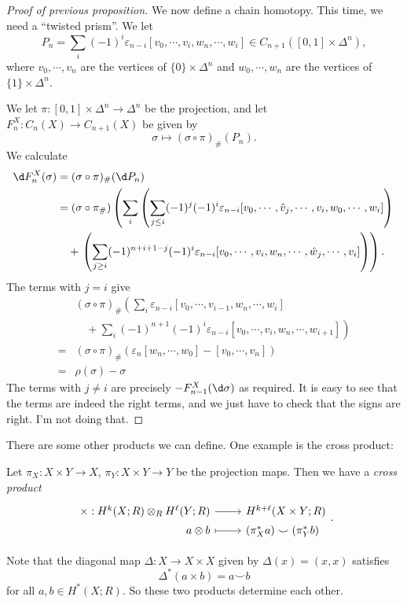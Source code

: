 \documentclass[a4paper]{article}
\begin{document}
\begin{proof}[Proof of previous proposition]
  We now define a chain homotopy. This time, we need a ``twisted prism''. We let
  \[
    P_n = \sum_i (-1)^i \varepsilon_{n - i} [v_0, \cdots, v_i, w_n, \cdots, w_i] \in C_{n + 1}([0, 1] \times \Delta^n),
  \]
  where $v_0, \cdots, v_n$ are the vertices of $\{0\} \times \Delta^n$ and $w_0, \cdots, w_n$ are the vertices of $\{1\} \times \Delta^n$.

  We let $\pi: [0, 1] \times \Delta^n \to \Delta^n$ be the projection, and let $F_n^X: C_n(X) \to C_{n + 1}(X)$ be given by
  \[
    \sigma \mapsto (\sigma \circ \pi)_\#(P_n).
  \]
  We calculate
  \begin{align*}
    \d F_n^X(\sigma) &= (\sigma \circ \pi)_\#(\d P_n) \\
    &= (\sigma \circ \pi_\#)\left(\sum_i \left(\sum_{j \leq i}(-1)^j (-1)^i \varepsilon_{n - i}[v_0, \cdots, \hat{v}_j, \cdots, v_i, w_0, \cdots, w_i]\right)\right.\\
    &\quad +\left.\left(\sum_{j \geq i} (-1)^{n + i + 1 - j}(-1)^i \varepsilon_{n - i}[v_0, \cdots, v_i, w_n, \cdots, \hat{w}_j, \cdots, v_i]\right)\right).
  \end{align*}
  The terms with $j = i$ give
  \begin{align*}
    &(\sigma \circ \pi)_\#\left(\sum_i \varepsilon_{n - i}[v_0, \cdots, v_{i - 1}, w_n, \cdots, w_i]\right. \\
    &\quad+ \left.\sum_i (-1)^{n + 1}(-1)^i \varepsilon_{n - i}[v_0, \cdots, v_i, w_n,\cdots, w_{i + 1}]\right)\\
    ={}& (\sigma \circ \pi)_\#(\varepsilon_n[w_n,\cdots, w_0] - [v_0, \cdots, v_n])\\
    ={}& \rho(\sigma) - \sigma
  \end{align*}
  The terms with $j \not= i$ are precisely $-F_{n - 1}^X (\d \sigma)$ as required. It is easy to see that the terms are indeed the right terms, and we just have to check that the signs are right. I'm not doing that.
\end{proof}

There are some other products we can define. One example is the cross product:
\begin{defi}
  Let $\pi_X: X \times Y \to X$, $\pi_Y: X \times Y\to Y$ be the projection maps. Then we have a \emph{cross product}
  \[
    \begin{tikzcd}[row sep = 0ex
        ,/tikz/column 1/.append style={anchor=base east}
        ,/tikz/column 2/.append style={anchor=base west}
      ]
      \times: H^k(X; R) \otimes_R H^\ell(Y; R) \ar[r] & H^{k + \ell}(X \times Y; R)\\
      a \otimes b \ar[r, maps to] & (\pi_X^* a) \smile (\pi_Y^* b)
    \end{tikzcd}.
  \]
\end{defi}
Note that the diagonal map $\Delta: X \to X \times X$ given by $\Delta(x) = (x, x)$ satisfies
\[
  \Delta^*(a \times b) = a \smile b
\]
for all $a, b \in H^*(X; R)$. So these two products determine each other.
\end{document}
